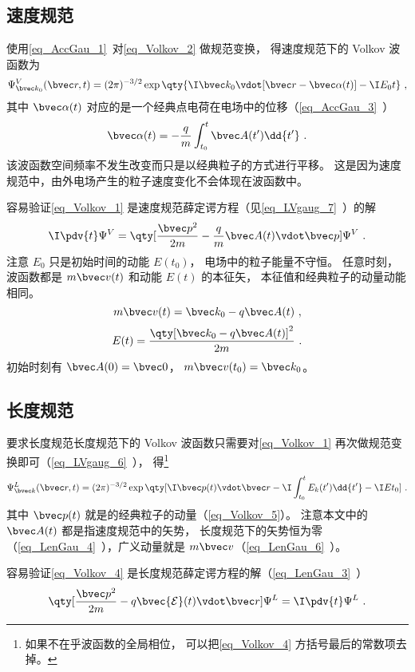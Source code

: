 \subsection{速度规范}
使用\autoref{eq_AccGau_1}~对\autoref{eq_Volkov_2} 做规范变换， 得速度规范下的 Volkov 波函数为
\begin{equation}\label{eq_Volkov_1}
\Psi_{\bvec k_0}^V(\bvec r, t) = (2\pi)^{-3/2} \exp\qty{\I \bvec k_0 \vdot [\bvec r - \bvec \alpha(t)] - \I E_0 t}~,
\end{equation}
其中 $\bvec \alpha(t)$ 对应的是一个经典点电荷在电场中的位移（\autoref{eq_AccGau_3}~）
\begin{equation}
\bvec \alpha(t) = -\frac{q}{m} \int_{t_0}^t \bvec A(t') \dd{t'}~.
\end{equation}
该波函数空间频率不发生改变而只是以经典粒子的方式进行平移。 这是因为速度规范中，由外电场产生的粒子速度变化不会体现在波函数中。

容易验证\autoref{eq_Volkov_1} 是速度规范薛定谔方程（见\autoref{eq_LVgaug_7}~）的解
\begin{equation}
\I \pdv{t} \Psi^V = \qty[\frac{\bvec p^2}{2m} - \frac{q}{m}\bvec A(t) \vdot \bvec p] \Psi^V~.
\end{equation}
注意 $E_0$ 只是初始时间的动能 $E(t_0)$， 电场中的粒子能量不守恒。 任意时刻， 波函数都是 $m\bvec v(t)$ 和动能 $E(t)$ 的本征矢， 本征值和经典粒子的动量动能相同。
\begin{equation}\label{eq_Volkov_5}
m\bvec v(t) = \bvec k_0 - q\bvec A(t)~,
\end{equation}
\begin{equation}
E(t) = \frac{\qty[\bvec k_0 - q\bvec A(t)]^2}{2m}~.
\end{equation}
初始时刻有 $\bvec A(0) = \bvec 0$， $m\bvec v(t_0) = \bvec k_0$。

\subsection{长度规范}
要求长度规范长度规范下的 Volkov 波函数只需要对\autoref{eq_Volkov_1} 再次做规范变换即可（\autoref{eq_LVgaug_6}~）， 得\footnote{如果不在乎波函数的全局相位， 可以把\autoref{eq_Volkov_4} 方括号最后的常数项去掉。}
\begin{equation}\label{eq_Volkov_4}
\Psi_{\bvec k}^L(\bvec r, t) = (2\pi)^{-3/2} \exp\qty[\I \bvec p(t)\vdot \bvec r - \I\int_{t_0}^t E_k(t') \dd{t'} - \I E t_0]~.
\end{equation}
其中 $\bvec p(t)$ 就是的经典粒子的动量（\autoref{eq_Volkov_5}）。 注意本文中的 $\bvec A(t)$ 都是指速度规范中的矢势， 长度规范下的矢势恒为零（\autoref{eq_LenGau_4}~），广义动量就是 $m\bvec v$（\autoref{eq_LenGau_6}~）。

容易验证\autoref{eq_Volkov_4} 是长度规范薛定谔方程的解（\autoref{eq_LenGau_3}~）
\begin{equation}
\qty[\frac{\bvec p^2}{2m} - q \bvec {\mathcal E}(t) \vdot \bvec r] \Psi^L = \I \pdv{t} \Psi^L~.
\end{equation}
